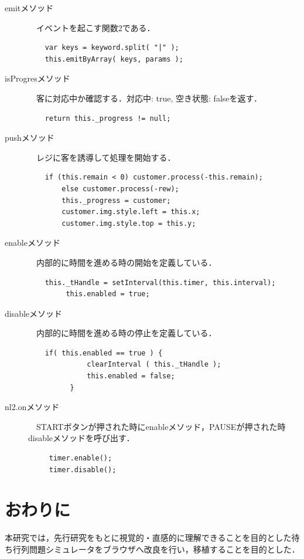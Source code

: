 \documentclass[12pt,a4j]{ltjsarticle}
\begin{document}
\begin{description}
\item[emitメソッド]　イベントを起こす関数2である． 
\begin{lstlisting}
	var keys = keyword.split( "|" );
	this.emitByArray( keys, params );
\end{lstlisting} 
\vspace{10mm}

\item[isProgresメソッド]　客に対応中か確認する．対応中: true, 空き状態: falseを返す． 
\begin{lstlisting}
	return this._progress != null;
\end{lstlisting} 
\vspace{10mm}

\item[pushメソッド]　レジに客を誘導して処理を開始する． 
\begin{lstlisting}
	if (this.remain < 0) customer.process(-this.remain);
        else customer.process(-rew);
        this._progress = customer;
        customer.img.style.left = this.x;
        customer.img.style.top = this.y;
\end{lstlisting} 
\vspace{10mm}

\item[enableメソッド]　内部的に時間を進める時の開始を定義している． 
\begin{lstlisting}
	this._tHandle = setInterval(this.timer, this.interval);
         this.enabled = true;
\end{lstlisting} 
\vspace{10mm}
\clearpage

\item[disableメソッド]　内部的に時間を進める時の停止を定義している． 
\begin{lstlisting}
	if( this.enabled == true ) {
              clearInterval ( this._tHandle );
              this.enabled = false;
          }
\end{lstlisting} 
\vspace{10mm}

\item[nl2.onメソッド]　STARTボタンが押された時にenableメソッド，PAUSEが押された時disableメソッドを呼び出す．
\begin{lstlisting}
	 timer.enable();
	 timer.disable();
\end{lstlisting} 
\vspace{10mm}
\end{description}
\clearpage

\section{おわりに}
本研究では，先行研究をもとに視覚的・直感的に理解できることを目的とした待ち行列問題シミュレータをブラウザへ改良を行い，移植することを目的とした．
\end{document}
